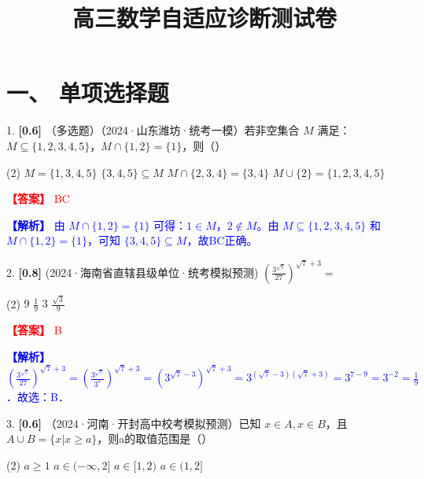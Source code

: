 \documentclass[11pt,a4paper]{article}
\title{\vspace{-2cm}\textbf{高三数学自适应诊断测试卷}}
\date{}
\begin{document}
\maketitle
\vspace{-1cm}
\section*{一、 单项选择题}
1. \textbf{[0.6]} （多选题）（2024·山东潍坊·统考一模）若非空集合 $M$ 满足：$M \subseteq \{1,2,3,4,5\}$，$M \cap \{1,2\}=\{1\}$，则（\quad）

\begin{tasks}(2)
    \task $M=\{1,3,4,5\}$
    \task $\{3,4,5\} \subseteq M$
    \task $M \cap \{2,3,4\}=\{3,4\}$
    \task $M \cup \{2\}=\{1,2,3,4,5\}$
\end{tasks}

\par\noindent\textcolor{red}{\textbf{【答案】} BC}
\par\noindent\textcolor{blue}{\textbf{【解析】} 由 $M \cap \{1,2\}=\{1\}$ 可得：$1 \in M$，$2 \notin M$。由 $M \subseteq \{1,2,3,4,5\}$ 和 $M \cap \{1,2\}=\{1\}$，可知 $\{3,4,5\} \subseteq M$，故BC正确。}

\vspace{0.5cm}

2. \textbf{[0.8]} (2024·海南省直辖县级单位·统考模拟预测) $\left(\frac{3^{\sqrt{7}}}{27}\right)^{\sqrt{7}+3}=$

\begin{tasks}(2)
    \task $9$
    \task $\frac{1}{9}$
    \task $3$
    \task $\frac{\sqrt{3}}{9}$
\end{tasks}

\par\noindent\textcolor{red}{\textbf{【答案】} B}
\par\noindent\textcolor{blue}{\textbf{【解析】} $\left(\frac{3^{\sqrt{7}}}{27}\right)^{\sqrt{7}+3}=\left(\frac{3^{\sqrt{7}}}{3^{3}}\right)^{\sqrt{7}+3}=\left(3^{\sqrt{7}-3}\right)^{\sqrt{7}+3}=3^{(\sqrt{7}-3)(\sqrt{7}+3)}=3^{7-9}=3^{-2}=\frac{1}{9}$．故选：B．}

\vspace{0.5cm}

3. \textbf{[0.6]} （2024·河南·开封高中校考模拟预测）已知 $x \in A, x \in B$，且 $A \cup B=\{x|x \geq a\}$，则a的取值范围是（\quad）

\begin{tasks}(2)
    \task $a \geq 1$
    \task $a \in (-\infty, 2]$
    \task $a \in [1, 2)$
    \task $a \in (1,2]$
\end{tasks}
\end{document}
